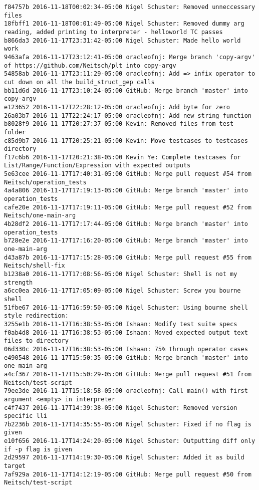 \begin{lstlisting}
f84757b 2016-11-18T00:02:34-05:00 Nigel Schuster: Removed unneccessary files
18fbff1 2016-11-18T00:01:49-05:00 Nigel Schuster: Removed dummy arg reading, added printing to interpreter - helloworld TC passes
b866da3 2016-11-17T23:31:42-05:00 Nigel Schuster: Made hello world work
9463afa 2016-11-17T23:12:41-05:00 oracleofnj: Merge branch 'copy-argv' of https://github.com/Neitsch/plt into copy-argv
54858ab 2016-11-17T23:11:29-05:00 oracleofnj: Add => infix operator to cut down on all the build_struct_gep calls
bb11d6d 2016-11-17T23:10:24-05:00 GitHub: Merge branch 'master' into copy-argv
e123652 2016-11-17T22:28:12-05:00 oracleofnj: Add byte for zero
26a03b7 2016-11-17T22:24:17-05:00 oracleofnj: Add new_string function
b8028f9 2016-11-17T20:27:37-05:00 Kevin: Removed files from test folder
c85d9b7 2016-11-17T20:25:21-05:00 Kevin: Move testcases to testcases directory
f17c6b6 2016-11-17T20:21:38-05:00 Kevin Ye: Complete testcases for List/Range/Function/Expression with expected outputs
5e63cee 2016-11-17T17:40:31-05:00 GitHub: Merge pull request #54 from Neitsch/operation_tests
4a4a806 2016-11-17T17:19:13-05:00 GitHub: Merge branch 'master' into operation_tests
cafe20e 2016-11-17T17:19:11-05:00 GitHub: Merge pull request #52 from Neitsch/one-main-arg
4b28df2 2016-11-17T17:17:44-05:00 GitHub: Merge branch 'master' into operation_tests
b728e2e 2016-11-17T17:16:20-05:00 GitHub: Merge branch 'master' into one-main-arg
d43a87b 2016-11-17T17:15:28-05:00 GitHub: Merge pull request #55 from Neitsch/shell-fix
b1238a0 2016-11-17T17:08:56-05:00 Nigel Schuster: Shell is not my strength
a6cc0ea 2016-11-17T17:05:09-05:00 Nigel Schuster: Screw you bourne shell
51fbe67 2016-11-17T16:59:50-05:00 Nigel Schuster: Using bourne shell style redirection:
3255e1b 2016-11-17T16:38:53-05:00 Ishaan: Modify test suite specs
f0ab4d8 2016-11-17T16:38:53-05:00 Ishaan: Moved expected output text files to directory
06d330c 2016-11-17T16:38:53-05:00 Ishaan: 75% through operator cases
e490548 2016-11-17T15:50:35-05:00 GitHub: Merge branch 'master' into one-main-arg
a4cf367 2016-11-17T15:50:29-05:00 GitHub: Merge pull request #51 from Neitsch/test-script
79ee3de 2016-11-17T15:18:58-05:00 oracleofnj: Call main() with first argument <empty> in interpreter
c4f7437 2016-11-17T14:39:38-05:00 Nigel Schuster: Removed version specific lli
7b2236b 2016-11-17T14:35:55-05:00 Nigel Schuster: Fixed if no flag is given
e10f656 2016-11-17T14:24:20-05:00 Nigel Schuster: Outputting diff only if -p flag is given
2d29597 2016-11-17T14:19:30-05:00 Nigel Schuster: Added it as build target
7af929a 2016-11-17T14:12:19-05:00 GitHub: Merge pull request #50 from Neitsch/test-script

\end{lstlisting}
